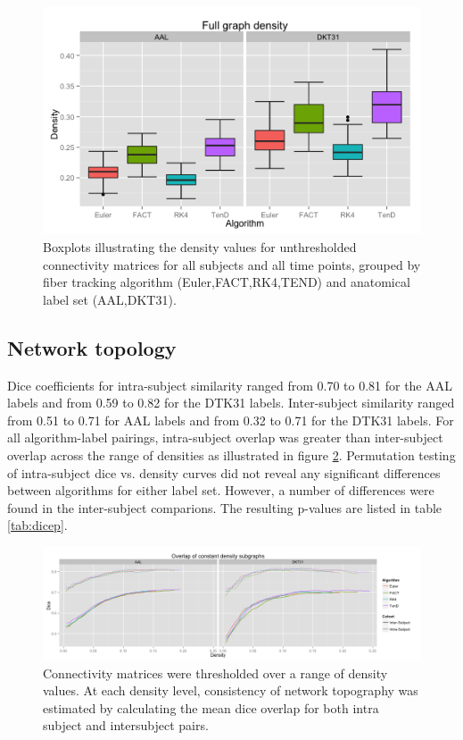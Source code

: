 \documentclass{frontiersSCNS} %
\begin{document}
\begin{figure}
\begin{center}
\includegraphics[width=0.5\linewidth]{figures/density_plot.png} 
\caption{Boxplots illustrating the density values for unthresholded connectivity matrices for all subjects and all time points, grouped by fiber tracking algorithm (Euler,FACT,RK4,TEND) and anatomical label set (AAL,DKT31).}
\label{fig:density}
\end{center}
\end{figure}

\subsection{Network topology}
Dice coefficients for intra-subject similarity ranged from 0.70 to 0.81 for the AAL labels and from 0.59 to 0.82 for the DTK31 labels. Inter-subject similarity ranged from 0.51 to 0.71 for AAL labels and from 0.32 to 0.71 for the DTK31 labels. For all algorithm-label pairings, intra-subject overlap was greater than inter-subject overlap across the range of densities as illustrated in figure \ref{fig:dice}. Permutation testing of intra-subject dice vs. density curves did not reveal any significant differences between algorithms for either label set. However, a number of differences were found in the inter-subject comparions. The resulting p-values are listed in table \ref{tab:dicep}.

\begin{figure}
\begin{center}
\includegraphics[width=0.5\linewidth]{figures/dice_overlap_plot.png} 
\caption{Connectivity matrices were thresholded over a range of density values. At each density level, consistency of network topography was estimated by calculating the mean dice overlap for both intra subject and intersubject pairs.}
\label{fig:dice}
\end{center}
\end{figure}
\end{document}
